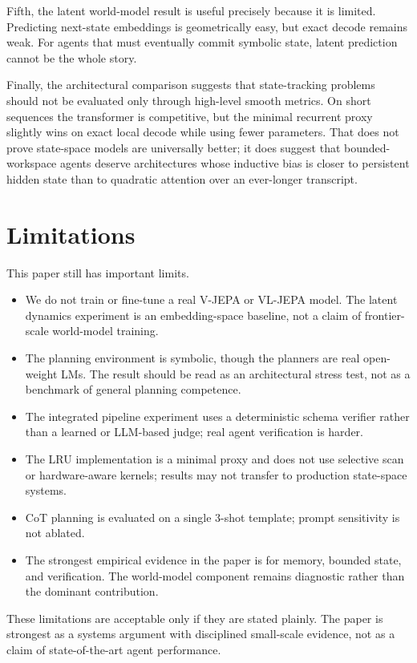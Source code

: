 \documentclass[11pt]{article}
\begin{document}
Fifth, the latent world-model result is useful precisely because it is limited. Predicting next-state embeddings is geometrically easy, but exact decode remains weak. For agents that must eventually commit symbolic state, latent prediction cannot be the whole story.

Finally, the architectural comparison suggests that state-tracking problems should not be evaluated only through high-level smooth metrics. On short sequences the transformer is competitive, but the minimal recurrent proxy slightly wins on exact local decode while using fewer parameters. That does not prove state-space models are universally better; it does suggest that bounded-workspace agents deserve architectures whose inductive bias is closer to persistent hidden state than to quadratic attention over an ever-longer transcript.

\section{Limitations}
This paper still has important limits.
\begin{itemize}
    \item We do not train or fine-tune a real V-JEPA or VL-JEPA model. The latent dynamics experiment is an embedding-space baseline, not a claim of frontier-scale world-model training.
    \item The planning environment is symbolic, though the planners are real open-weight LMs. The result should be read as an architectural stress test, not as a benchmark of general planning competence.
    \item The integrated pipeline experiment uses a deterministic schema verifier rather than a learned or LLM-based judge; real agent verification is harder.
    \item The LRU implementation is a minimal proxy and does not use selective scan or hardware-aware kernels; results may not transfer to production state-space systems.
    \item CoT planning is evaluated on a single 3-shot template; prompt sensitivity is not ablated.
    \item The strongest empirical evidence in the paper is for memory, bounded state, and verification. The world-model component remains diagnostic rather than the dominant contribution.
\end{itemize}

These limitations are acceptable only if they are stated plainly. The paper is strongest as a systems argument with disciplined small-scale evidence, not as a claim of state-of-the-art agent performance.
\end{document}
